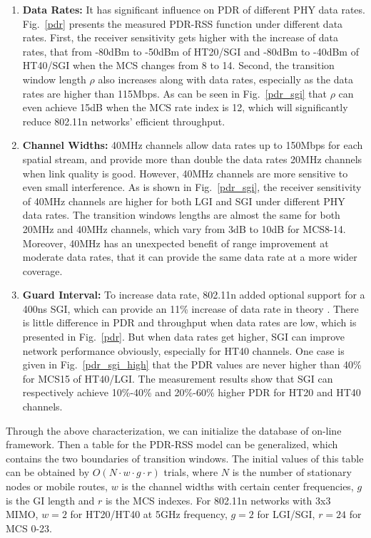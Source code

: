 \documentclass[draftclsnofoot,journal,onecolumn,11pt]{IEEEtran}
\begin{document}
\begin{enumerate}
  \item \textbf{Data Rates:} It has significant influence on PDR of different PHY data rates. Fig.~\ref{pdr} presents the measured PDR-RSS function under different data rates. First, the receiver sensitivity gets higher with the increase of data rates, that from -80dBm to -50dBm of HT20/SGI and -80dBm to -40dBm of HT40/SGI when the MCS changes from 8 to 14. Second, the transition window length $\rho$ also increases along with data rates, especially as the data rates are higher than 115Mbps. As can be seen in Fig.~\ref{pdr_sgi} that $\rho$ can even achieve 15dB when the MCS rate index is 12, which will significantly reduce 802.11n networks' efficient throughput.
  \item \textbf{Channel Widths:} 40MHz channels allow data rates up to 150Mbps for each spatial stream, and provide more than double the data rates 20MHz channels when link quality is good. However, 40MHz channels are more sensitive to even small interference. As is shown in Fig.~\ref{pdr_sgi}, the receiver sensitivity of 40MHz channels are higher for both LGI and SGI under different PHY data rates. The transition windows lengths are almost the same for both 20MHz and 40MHz channels, which vary from 3dB to 10dB for MCS8-14. Moreover, 40MHz has an unexpected benefit of range improvement at moderate data rates, that it can provide the same data rate at a more wider coverage.
  \item \textbf{Guard Interval:} To increase data rate, 802.11n added optional support for a 400ns SGI, which can provide an 11\% increase of data rate in theory \cite{perahia2008next}. There is little difference in PDR and throughput when data rates are low, which is presented in Fig.~\ref{pdr}. But when data rates get higher, SGI can improve network performance obviously, especially for HT40 channels. One case is given in Fig.~\ref{pdr_sgi_high} that the PDR values are never higher than 40\% for MCS15 of HT40/LGI. The measurement results show that SGI can respectively achieve 10\%-40\% and 20\%-60\% higher PDR for HT20 and HT40 channels.
\end{enumerate}
%

Through the above characterization, we can initialize the database of on-line framework. Then a table for the PDR-RSS model can be generalized, which contains the two boundaries of transition windows. The initial values of this table can be obtained by $\textit{O}(N \cdot w \cdot g \cdot r)$ trials, where $N$ is the number of stationary nodes or mobile routes, $w$ is the channel widths with certain center frequencies, $g$ is the GI length and $r$ is the MCS indexes. For 802.11n networks with 3x3 MIMO, $w=2$ for HT20/HT40 at 5GHz frequency, $g=2$ for LGI/SGI, $r=24$ for MCS 0-23.
\end{document}
